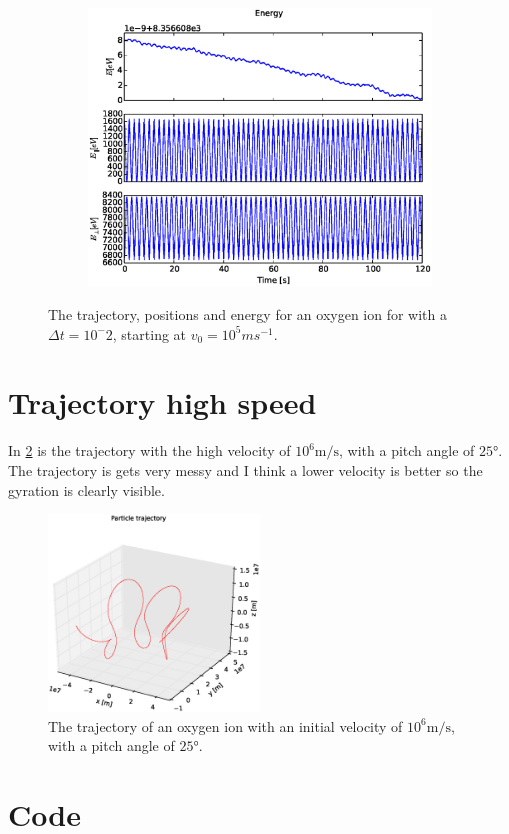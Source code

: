 \documentclass[x11names]{article}
\begin{document}
\begin{figure}[ht]
\begin{subfigure}{0.33\textwidth}
      \end{subfigure}
      \begin{subfigure}{0.33\textwidth}
        \includegraphics[width = \textwidth]{figures/rk4_E_6_2}
      \end{subfigure}
      \caption{The trajectory, positions and energy for an oxygen ion for with a \(\Delta t = 10^-2\), starting at \(v_0 = 10^5 \si{ms^{-1} }\).}
      \label{fig:results}
    \end{figure}

    

\section{ Trajectory high speed }
  \label{sec:high_vel}
    In \cref{fig:high_vel} is the trajectory with the high velocity of \(10^6 \si{\meter\per\second}\), with a pitch angle of \(25\si{\degree}\). The trajectory is gets very messy and I think a lower velocity is better so the gyration is clearly visible.

    \begin{figure}
      \centering 
      \includegraphics[width = 0.5\textwidth]{figures/rk4_3D_v6}
      \caption{The trajectory of an oxygen ion with an initial velocity of \(10^6 \si{\meter\per\second}\), with a pitch angle of \(25\si{\degree}\).}
      \label{fig:high_vel}
    \end{figure}




\section{Code}
  \label{sec:code}
  

      
\end{document}
